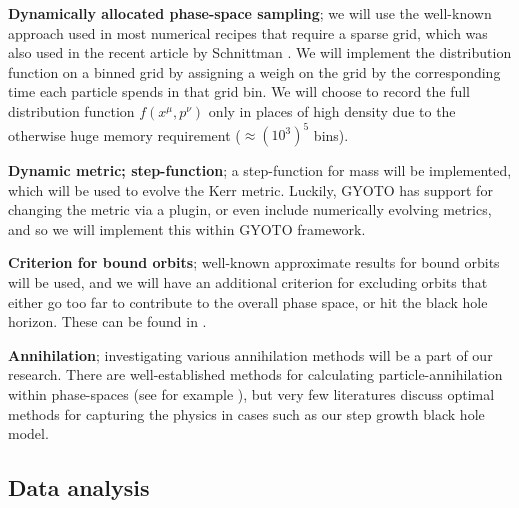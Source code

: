 \documentclass[12pt]{article}
\begin{document}
\textbf{Dynamically allocated phase-space sampling}; we will use the well-known approach used in most numerical recipes that require 
a sparse grid, which was also used in the recent article by Schnittman \citep{schnittman2015}. %
We will implement the distribution function on a binned grid by assigning a weigh on the grid by the corresponding time each particle spends in 
that grid bin. We will choose to record the full distribution function $f(x^\mu,p^\nu)$ only in places of high density due to the otherwise 
huge memory requirement ($\approx (10^3)^5$ bins)\citep{schnittman2015}.

\textbf{Dynamic metric; step-function}; a step-function for mass will be implemented, which will be used to evolve the Kerr metric. 
Luckily, GYOTO has support for changing the metric via a plugin, or even include numerically evolving metrics, and so we will 
implement this within GYOTO framework.

\textbf{Criterion for bound orbits}; well-known approximate results for bound orbits will be used, and we will have an additional criterion 
for excluding orbits that either go too far to contribute to the overall phase space, or hit the black hole horizon. These can be found in 
\citep{Sadeghian_Ferrer_Will_2013, schnittman2015}.

\textbf{Annihilation}; investigating various annihilation methods will be a part of our research. 
There are well-established methods for calculating 
particle-annihilation within phase-spaces (see for example \citep{boltzmann_dm_annihilation}), 
but very few literatures discuss optimal methods for capturing the physics in cases such as 
our step growth black hole model.




\subsection{Data analysis}
\end{document}
